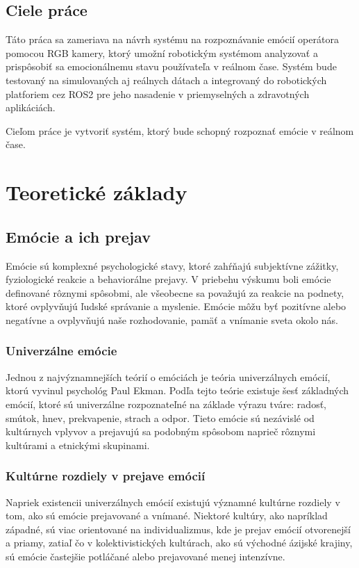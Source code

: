 \subsection{Ciele práce}
Táto práca sa zameriava na návrh systému na rozpoznávanie emócií operátora pomocou RGB kamery, ktorý umožní robotickým systémom analyzovať a prispôsobiť sa emocionálnemu stavu používateľa v reálnom čase. Systém bude testovaný na simulovaných aj reálnych dátach a integrovaný do robotických platforiem cez ROS2 pre jeho nasadenie v priemyselných a zdravotných aplikáciách.

Cieľom práce je vytvoriť systém, ktorý bude schopný rozpoznať emócie v reálnom čase.

\section{Teoretické základy}
\subsection{Emócie a ich prejav}
Emócie sú komplexné psychologické stavy, ktoré zahŕňajú subjektívne zážitky, fyziologické reakcie a behaviorálne prejavy. V priebehu výskumu boli emócie definované rôznymi spôsobmi, ale všeobecne sa považujú za reakcie na podnety, ktoré ovplyvňujú ľudské správanie a myslenie. Emócie môžu byť pozitívne alebo negatívne a ovplyvňujú naše rozhodovanie, pamäť a vnímanie sveta okolo nás. \cite{CANAL2022593}
\subsubsection{Univerzálne emócie}
Jednou z najvýznamnejších teórií o emóciách je teória univerzálnych emócií, ktorú vyvinul psychológ Paul Ekman. Podľa tejto teórie existuje šesť základných emócií, ktoré sú univerzálne rozpoznateľné na základe výrazu tváre: radosť, smútok, hnev, prekvapenie, strach a odpor​. Tieto emócie sú nezávislé od kultúrnych vplyvov a prejavujú sa podobným spôsobom naprieč rôznymi kultúrami a etnickými skupinami. \cite{9674818}
\subsubsection{Kultúrne rozdiely v prejave emócií}
Napriek existencii univerzálnych emócií existujú významné kultúrne rozdiely v tom, ako sú emócie prejavované a vnímané. Niektoré kultúry, ako napríklad západné, sú viac orientované na individualizmus, kde je prejav emócií otvorenejší a priamy, zatiaľ čo v kolektivistických kultúrach, ako sú východné ázijské krajiny, sú emócie častejšie potláčané alebo prejavované menej intenzívne​. \cite{CANAL2022593}
